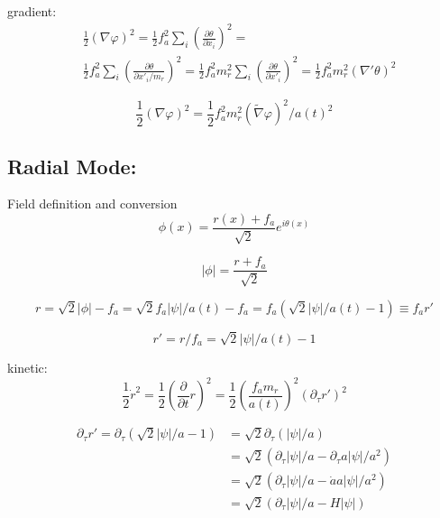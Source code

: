 \documentclass[a4paper]{article}
\begin{document}
gradient:
\begin{align}
 &\frac{1}{2} (\nabla \varphi)^2 =
 \frac{1}{2} f_a^2 \sum_i \left(\frac{\partial \theta}{\partial x_i}\right)^2 = \\
 &\frac{1}{2} f_a^2 \sum_i \left(\frac{\partial \theta}{\partial x'_i / m_r}\right)^2 =
 \frac{1}{2} f_a^2 m_r^2 \sum_i \left(\frac{\partial \theta}{\partial x'_i}\right)^2 =
 \frac{1}{2} f_a^2 m_r^2 (\nabla' \theta)^2
\end{align}

\begin{equation}
    \frac{1}{2} (\nabla \varphi)^2 = \frac{1}{2} f_a^2 m_r^2 (\tilde{\nabla} \varphi)^2 / a(t)^2
\end{equation}

\subsection{Radial Mode:}

Field definition and conversion
\begin{equation}
    \phi(x) = \frac{r(x) + f_a}{\sqrt{2}} e^{i \theta(x) }
\end{equation}

\begin{equation}
    |\phi| = \frac{r + f_a}{\sqrt{2}}
\end{equation}

\begin{equation}
    r = \sqrt{2} |\phi| - f_a
    = \sqrt{2} f_a |\psi| / a(t) - f_a
    = f_a \left( \sqrt{2} |\psi| / a(t) - 1 \right)
    \equiv f_a r'
\end{equation}

\begin{equation}
    r' = r / f_a = \sqrt{2} |\psi| / a(t) - 1
\end{equation}

kinetic:
\begin{equation}
    \frac{1}{2} \dot{r}^2 = \frac{1}{2} (\frac{\partial}{\partial t} r)^2
    = \frac{1}{2} (\frac{f_a m_r}{a(t)})^2 \left( \partial_\tau r' \right)^2
\end{equation}

\begin{align}
    \partial_\tau r' = \partial_\tau \left( \sqrt{2} |\psi| / a - 1 \right)
    &= \sqrt{2} \partial_\tau ( |\psi| / a ) \\
    &= \sqrt{2} (\partial_\tau |\psi| / a - \partial_\tau a |\psi| / a^2) \\
    &= \sqrt{2} (\partial_\tau |\psi| / a - \dot{a} a |\psi| / a^2) \\
    &= \sqrt{2} (\partial_\tau |\psi| / a - H |\psi|)
\end{align}
\end{document}
